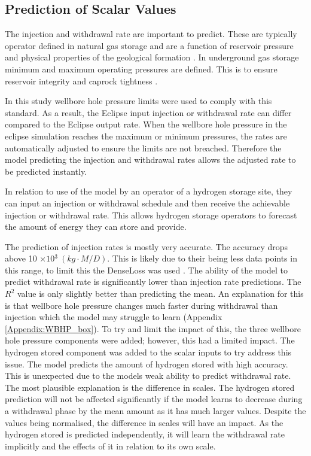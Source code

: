 \subsection{Prediction of Scalar Values}

The injection and withdrawal rate are important to predict. These are typically operator defined in natural gas storage and are a function of reservoir pressure and physical properties of the geological formation \citep{brkic2021underground}. In underground gas storage minimum and maximum operating pressures are defined. This is to ensure reservoir integrity and caprock tightness \citep{wlodek2026underground}.

In this study wellbore hole pressure limits were used to comply with this standard. As a result, the Eclipse input injection or withdrawal rate can differ compared to the Eclipse output rate. When the wellbore hole pressure in the eclipse simulation reaches the maximum or minimum pressures, the rates are automatically adjusted to ensure the limits are not breached. Therefore the model predicting the injection and withdrawal rates allows the adjusted rate to be predicted instantly.

In relation to use of the model by an operator of a hydrogen storage site, they can input an injection or withdrawal schedule and then receive the achievable injection or withdrawal rate. This allows hydrogen storage operators to forecast the amount of energy they can store and provide. 

The prediction of injection rates is mostly very accurate. The accuracy drops above 10 $\times 10{^3} \ (kg \cdot M / D)$. This is likely due to their being less data points in this range, to limit this the DenseLoss was used \citep{steininger2021density}. The ability of the model to predict withdrawal rate is significantly lower than injection rate predictions. The $R^2$ value is only slightly better than predicting the mean. An explanation for this is that wellbore hole pressure changes much faster during withdrawal than injection which the model may struggle to learn (Appendix \ref{Appendix:WBHP_box}). To try and limit the impact of this, the three wellbore hole pressure components were added; however, this had a limited impact. The hydrogen stored component was added to the scalar inputs to try address this issue. The model predicts the amount of hydrogen stored with high accuracy. This is unexpected due to the models weak ability to predict withdrawal rate. The most plausible explanation is the difference in scales. The hydrogen stored prediction will not be affected significantly if the model learns to decrease during a withdrawal phase by the mean amount as it has much larger values. Despite the values being normalised, the difference in scales will have an impact. As the hydrogen stored is predicted independently, it will learn the withdrawal rate implicitly and the effects of it in relation to its own scale.

